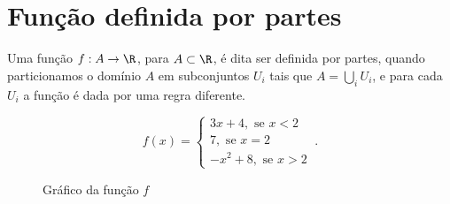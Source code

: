 \section{Função definida por partes}

\begin{defi}
Uma função $f: A \to \R$, para $A \subset \R$, é dita ser definida por partes, quando particionamos o domínio $A$ em subconjuntos $U_i$ tais que $A= \bigcup_{i}U_i$, e para cada $U_i$ a função é dada por uma regra diferente. 
\end{defi}

\begin{exem}
\begin{equation}
f(x) = \begin{cases}
                 3x + 4, \text{ se } x < 2 \\
                 7 , \text{ se } x = 2 \\
                 -x^2 + 8, \text{ se } x > 2
                \end{cases} \ .
\end{equation}
   \begin{figure}[H]
  \centering
   \caption{Gráfico da função $f$}
  \end{figure}
\end{exem}

